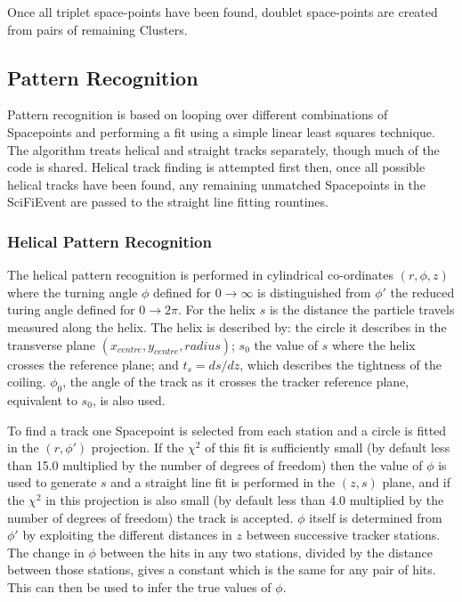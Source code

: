   Once all triplet space-points have been found, doublet space-points are created from pairs of remaining Clusters. 


  \subsection{Pattern Recognition}
  \label{subsec:PatternRecognition}

  Pattern recognition is based on looping over different combinations of Spacepoints and performing a fit using a simple linear least squares technique.  The algorithm treats helical and straight tracks separately, though much of the code is shared. Helical track finding is attempted first then, once all possible helical tracks have been found, any remaining unmatched Spacepoints in the SciFiEvent are passed to the straight line fitting rountines.

   \subsubsection{Helical Pattern Recognition}
   \label{subsubsec:HelicalPatternRecognition}

   The helical pattern recognition is performed in cylindrical co-ordinates $(r, \phi, z)$ where the turning angle $\phi$ defined for $0 \rightarrow \infty$ is distinguished from $\phi '$ the reduced turing angle defined  for $0 \rightarrow 2\pi$. For the helix $s$ is the distance the particle travels measured along the helix. The helix is described by: the circle it describes in the transverse plane $(x_{centre}, y_{centre}, radius)$; $s_0$ the value of $s$ where the helix crosses the reference plane; and $t_s = ds/dz$, which describes the tightness of the coiling. $\phi_0$, the angle of the track as it crosses the tracker reference plane, equivalent to $s_0$, is also used. 

   To find a track one Spacepoint is selected from each station and a circle is fitted in the $(r, \phi')$ projection. If the $\chi^2$ of this fit is sufficiently small (by default less than 15.0 multiplied by the number of degrees of freedom) then the value of $\phi$ is used to generate $s$ and a straight line fit is performed in the $(z,s)$ plane, and if the $\chi^2$ in this projection is also small (by default less than 4.0 multiplied by the number of degrees of freedom) the track is accepted.  $\phi$ itself is determined from $\phi'$ by exploiting the different distances in $z$ between successive tracker stations.  The change in $\phi$ between the hits in any two stations, divided by the distance between those stations, gives a constant which is the same for any pair of hits.  This can then be used to infer the true values of $\phi$.

